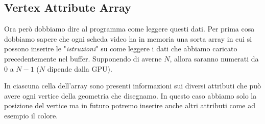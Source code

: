 \subsection{Vertex Attribute Array}
Ora per\`o dobbiamo dire al programma come leggere questi dati.
Per prima cosa dobbiamo sapere che ogni scheda video ha in memoria una sorta array in
cui si possono inserire le "\emph{istruzioni}" su come leggere i dati che abbiamo caricato
precedentemente nel buffer. Supponendo di averne $N$, allora saranno numerati da 0 a $N-1$
($N$ dipende dalla GPU).

In ciascuna cella dell'array sono presenti informazioni sui diversi attributi che pu\`o
avere ogni vertice della geometria che disegnamo. In questo caso abbiamo solo la posizione
del vertice ma in futuro potremo inserire anche altri attributi come ad esempio il colore.


